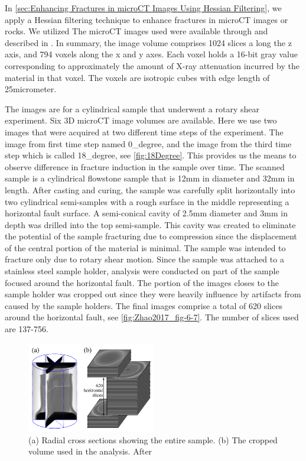 \documentclass{edger}
\begin{document}
In \autoref{sec:Enhancing Fractures in microCT Images Using Hessian Filtering}, we apply a Hessian filtering technique to enhance fractures in microCT images or rocks. We utilized The microCT images used were available through \cite{Zhao2020} and described in \cite{Zhao2017,Zhao2020}. In summary, the image volume comprises 1024 slices a long the z axis, and 794 voxels along the x and y axes. Each voxel holds a 16-bit gray value corresponding to approximately the amount of X-ray attenuation incurred by the material in that voxel. The voxels are isotropic cubes with edge length of 25micrometer. 

The images are for a cylindrical sample that underwent a rotary shear experiment. Six 3D microCT image volumes are available. Here we use two images that were acquired at two different time steps of the experiment. The image from first time step named 0\_degree, and the image from the third time step which is called 18\_degree, see \autoref{fig:18Degree}. This provides us the means to observe difference in fracture induction in the sample over time. The scanned sample is a cylindrical flowstone sample that is 12mm in diameter and 32mm in length. After casting and curing, the sample was carefully split horizontally into two cylindrical semi-samples with a rough surface in the middle representing a horizontal fault surface. A semi-conical cavity of 2.5mm diameter and 3mm in depth was drilled into the top semi-sample. This cavity was created to eliminate the potential of the sample fracturing due to compression since the displacement of the central portion of the material is minimal. The sample was intended to fracture only due to rotary shear motion. Since the sample was attached to a stainless steel sample holder, analysis were conducted on part of the sample focused around the horizontal fault. The portion of the images closes to the sample holder was cropped out since they were heavily influence by artifacts from caused by the sample holders. The final images comprise a total of 620 slices around the horizontal fault, see \autoref{fig:Zhao2017_fig-6-7}. The number of slices used are 137-756. 

\begin{figure}[!h]
\centering
\includegraphics[width=0.5\textwidth]{Zhao2017_6-7.png}
\caption{(a) Radial cross sections showing the entire sample. (b) The cropped volume used in the analysis. After \cite{Zhao2017}}
\label{fig:Zhao2017_fig-6-7}
\end{figure}
\end{document}
